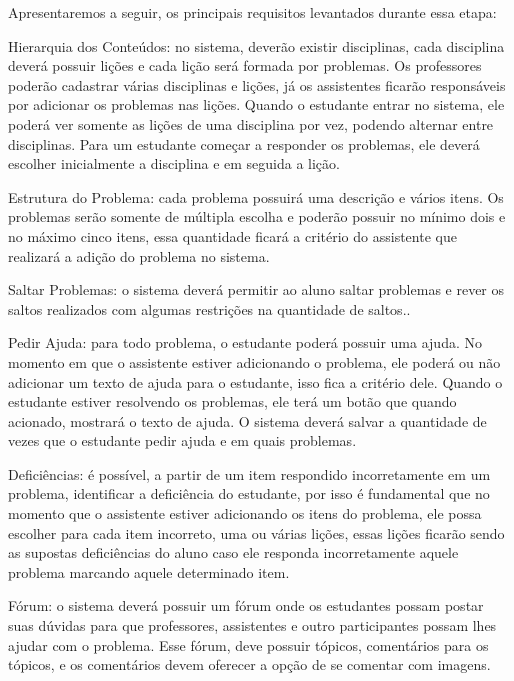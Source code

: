 Apresentaremos a seguir, os principais requisitos levantados durante essa etapa:

\begin{alineascomponto}
	\item Hierarquia dos Conteúdos: no sistema, dever\~ao existir disciplinas, cada disciplina dever\'a possuir li\c{c}\~oes e cada li\c{c}\~ao ser\'a formada por problemas. Os professores poder\~ao 
cadastrar v\'arias disciplinas e li\c{c}\~oes, j\'a os assistentes ficar\~ao responsáveis por adicionar os problemas nas li\c{c}\~oes. Quando o estudante entrar no sistema, ele poder\'a ver somente 
as li\c{c}\~oes de uma disciplina por vez, podendo alternar entre disciplinas. Para um estudante come\c{c}ar a responder os problemas, ele dever\'a escolher inicialmente a disciplina e em seguida a 
li\c{c}\~ao. 

	\item Estrutura do Problema: cada problema possuir\'a uma descri\c{c}\~ao e v\'arios itens. Os problemas ser\~ao somente de m\'ultipla escolha e poder\~ao possuir no m\'inimo dois e no m\'aximo 
cinco itens, essa quantidade ficar\'a a crit\'erio do assistente que realizar\'a a adi\c{c}\~ao do problema no sistema.

	\item Saltar Problemas: o sistema deverá permitir ao aluno saltar problemas e rever os saltos 
realizados com algumas restrições na quantidade de saltos..
	
	\item Pedir Ajuda: para todo problema, o estudante poderá possuir uma ajuda. No momento em que o assistente estiver adicionando o problema, ele poderá ou não adicionar um texto de ajuda para o 
estudante, isso fica a critério dele. Quando o estudante estiver resolvendo os problemas, ele terá um botão que quando acionado, mostrar\'a o texto de ajuda. O sistema dever\'a salvar a quantidade 
de vezes que o estudante pedir ajuda e em quais problemas.
	
	\item Defici\^encias: \'e possível, a partir de um item respondido incorretamente em um problema, identificar a deficiência do estudante, por isso é fundamental que no momento que o 
assistente estiver adicionando os itens do problema, ele possa escolher para cada item incorreto, uma ou várias li\c{c}\~oes, essas lições ficarão sendo as supostas deficiências do aluno caso ele 
responda incorretamente aquele problema marcando aquele determinado item.
	
	\item F\'orum: o sistema deverá possuir um fórum onde os estudantes possam postar suas dúvidas para que professores, assistentes e outro participantes possam lhes ajudar com o problema. Esse fórum, deve possuir tópicos, comentários para os tópicos, e os comentários devem oferecer a opção de se comentar com imagens. 

\end{alineascomponto}

